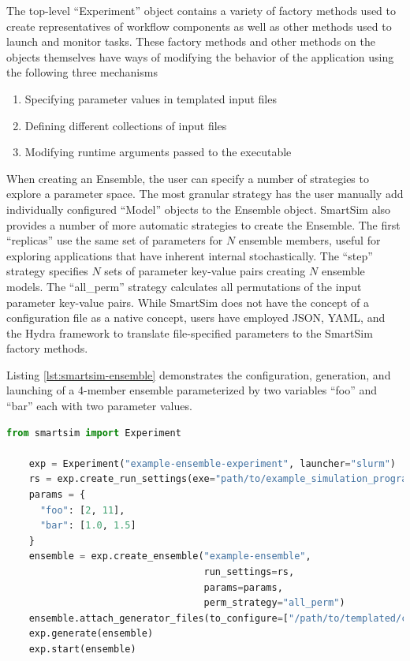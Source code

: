 \documentclass[utf8]{FrontiersinVancouver} %
\begin{document}
The top-level ``Experiment'' object contains a variety of factory methods used to create representatives of workflow components as well as other methods used to launch and monitor tasks. These factory methods and other methods on the objects themselves have ways of modifying the behavior of the application using the following three mechanisms
\begin{enumerate}
    \item Specifying parameter values in templated input files
    \item Defining different collections of input files
    \item Modifying runtime arguments passed to the executable
\end{enumerate}
When creating an Ensemble, the user can specify a number of strategies to explore a parameter space. The most granular strategy has the user manually add individually configured ``Model'' objects to the Ensemble object. SmartSim also provides a number of more automatic strategies to create the Ensemble. The first ``replicas'' use the same set of parameters for $N$ ensemble members, useful for exploring applications that have inherent internal stochastically. The ``step'' strategy specifies $N$ sets of parameter key-value pairs creating $N$ ensemble models. The ``all\_perm'' strategy calculates all permutations of the input parameter key-value pairs. While SmartSim does not have the concept of a configuration file as a native concept, users have employed JSON, YAML, and the Hydra framework \cite{Hadan2019Hydra} to translate file-specified parameters to the SmartSim factory methods.

Listing \ref{lst:smartsim-ensemble} demonstrates the configuration, generation, and launching of a 4-member ensemble parameterized by two variables ``foo'' and ``bar'' each with two parameter values. 

\begin{lstlisting}[language=python,caption={Configuration of an ensemble in SmartSim},captionpos=b,label=lst:smartsim-ensemble]
    from smartsim import Experiment

    exp = Experiment("example-ensemble-experiment", launcher="slurm")
    rs = exp.create_run_settings(exe="path/to/example_simulation_program")
    params = {
      "foo": [2, 11],
      "bar": [1.0, 1.5]
    }
    ensemble = exp.create_ensemble("example-ensemble", 
                                   run_settings=rs, 
                                   params=params, 
                                   perm_strategy="all_perm")
    ensemble.attach_generator_files(to_configure=["/path/to/templated/config/file"])
    exp.generate(ensemble)
    exp.start(ensemble)
\end{lstlisting}
\end{document}
